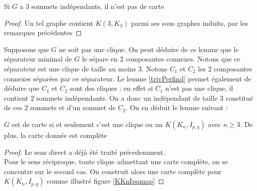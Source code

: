 \documentclass{scrartcl}
\begin{document}
\begin{flushleft}
\begin{lem}\label{trivPerfind}
    Si $G$ a $3$ sommets indépendants, il n'est pas de carte
\end{lem}

\begin{proof}
    Un tel graphe contient $K(3, K_3)$ parmi ses sous graphes induits, par les remarques précédentes
\end{proof}

Supposons que $G$ ne soit pas une clique.
On peut déduire de ce lemme que le séparateur minimal de $G$ le sépare en $2$ composantes connexes. Notons que ce séparateur est une
clique de taille au moins $3$. Notons $C_1$ et $C_2$ les $2$ composantes connexes séparées par ce séparateur. Le lemme
\ref{trivPerfind} permet également de déduire que $C_1$ et $C_2$ sont des cliques : en effet si $C_1$ n'est pas une clique,
il contient $2$ sommets indépendants. On a donc un indépendant de taille $3$ constitué de ces $2$ sommets et d'un sommet de $C_2$.
On en déduit le lemme suivant :

\begin{lem}\label{trivPar3conn}
    $G$ est de carte si et seulement c'est une clique ou un $K(K_n, I_{p,q})$ avec $n \geq 3$. De plus, la carte
    donnée est complète
\end{lem}

\begin{proof}
    Le sens direct a déjà été traité précedemment.\\
    Pour le sens réciproque, toute clique admettant une carte complète, on se concentre sur le second cas. On construit
    alors une carte complète pour $K(K_n, I_{p,q})$ comme illustré figure \ref{KKnIpqmap}
\end{proof}


\end{flushleft}
\end{document}
